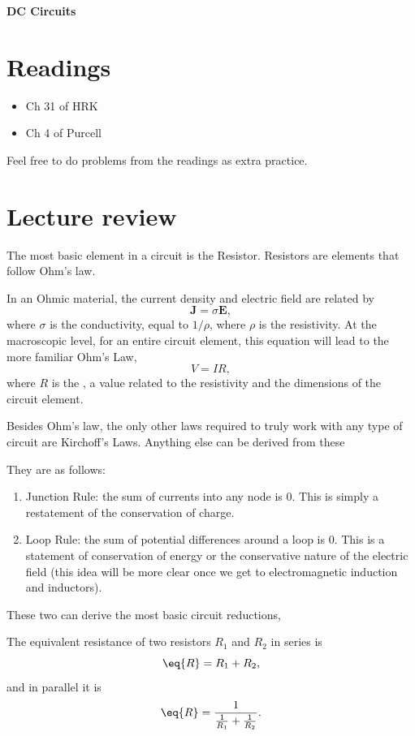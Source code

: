 \documentclass[11pt]{scrartcl}
\title{\titlee}
\author{Cambridge Physics Academy}
\date{2023-2024}
\newcommand{\titlee}{DC Circuits}
\begin{document}
\thispagestyle{empty}
\begin{center}
    
    
    \Huge \textbf{\textsf{\titlee}}

    \large \theauthor
\end{center}

\setcounter{section}{-1}
\section{Readings}
\begin{itemize}
    \item Ch 31 of HRK
    \item Ch 4 of Purcell
\end{itemize}
Feel free to do problems from the readings as extra practice.


\section{Lecture review}

The most basic element in a circuit is the Resistor. Resistors are elements that follow Ohm's law.

\begin{defn}
    In an Ohmic material, the current density and electric field are related by $$\mathbf J = \sigma \mathbf E,$$ where $\sigma$ is the conductivity, equal to $1/\rho$, where $\rho$ is the resistivity. At the macroscopic level, for an entire circuit element, this equation will lead to the more familiar Ohm's Law, $$V = IR,$$ where $R$ is the , a value related to the resistivity and the dimensions of the circuit element.
\end{defn}

Besides Ohm's law, the only other laws required to truly work with any type of circuit are Kirchoff's Laws. Anything else can be derived from these

\begin{theorem}
    They are as follows:
    \begin{enumerate}
        \item Junction Rule: the sum of currents into any node is 0. This is simply a restatement of the conservation of charge.
        \item Loop Rule: the sum of potential differences around a loop is 0. This is a statement of conservation of energy or the conservative nature of the electric field (this idea will be more clear once we get to electromagnetic induction and inductors).
    \end{enumerate}
\end{theorem}
These two can derive the most basic circuit reductions,
\begin{idea}
    The equivalent resistance of two resistors $R_1$ and $R_2$ in series is
    $$\eq{R} = R_1 + R_2,$$
    and in parallel it is
    $$\eq{R} = \frac{1}{\frac{1}{R_1} + \frac{1}{R_2}}.$$
\end{idea}
\end{document}
